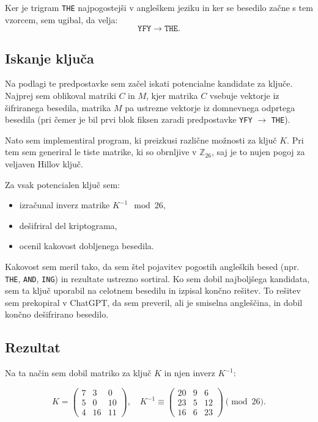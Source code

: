 \documentclass[12pt,a4paper]{article}
\begin{document}
Ker je trigram \texttt{THE} najpogostejši v angleškem jeziku in ker se besedilo začne s tem vzorcem, sem ugibal, da velja:
\[
\texttt{YFY} \longrightarrow \texttt{THE}.
\]

\subsection{Iskanje ključa}

Na podlagi te predpostavke sem začel iskati potencialne kandidate za ključe. Najprej sem oblikoval matriki $C$ in $M$, kjer matrika $C$ vsebuje vektorje iz šifriranega besedila, matrika $M$ pa ustrezne vektorje iz domnevnega odprtega besedila (pri čemer je bil prvi blok fiksen zaradi predpostavke \texttt{YFY} $\rightarrow$ \texttt{THE}).

Nato sem implementiral program, ki preizkusi različne možnosti za ključ $K$. Pri tem sem generiral le tiste matrike, ki so obrnljive v $\mathbb{Z}_{26}$, saj je to nujen pogoj za veljaven Hillov ključ.

Za vsak potencialen ključ sem:
\begin{itemize}
\item izračunal inverz matrike $K^{-1} \mod 26$,
\item dešifriral del kriptograma,
\item ocenil kakovost dobljenega besedila.
\end{itemize}

Kakovost sem meril tako, da sem štel pojavitev pogostih angleških besed (npr. \texttt{THE}, \texttt{AND}, \texttt{ING}) in rezultate ustrezno sortiral. Ko sem dobil najboljšega kandidata, 
sem ta ključ uporabil na celotnem besedilu in izpisal končno rešitev.
To rešitev sem prekopiral v ChatGPT, da sem preveril, ali je smiselna angleščina,
 in dobil končno dešifrirano besedilo.

\subsection{Rezultat}

Na ta način sem dobil matriko za ključ $K$ in njen inverz $K^{-1}$:

\[
K =
\begin{pmatrix}
7 & 3 & 0 \\
5 & 0 & 10 \\
4 & 16 & 11
\end{pmatrix},
\quad
K^{-1} \equiv
\begin{pmatrix}
20 & 9 & 6 \\
23 & 5 & 12 \\
16 & 6 & 23
\end{pmatrix}
\pmod{26}.
\]
\end{document}
